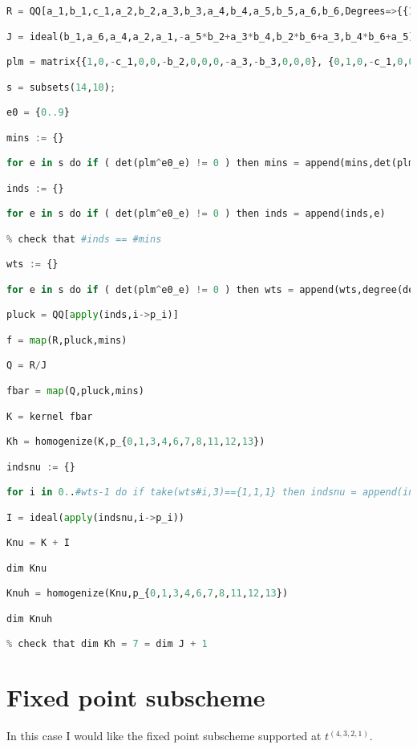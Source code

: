 \documentclass[11pt,draft]{article}
\begin{document}
\begin{lstlisting}[language=Python]
R = QQ[a_1,b_1,c_1,a_2,b_2,a_3,b_3,a_4,b_4,a_5,b_5,a_6,b_6,Degrees=>{{1,0,0,0},{1,0,0,1},{1,0,0,2},{1,1,0,0},{1,1,0,1},{1,1,1,0},{1,1,1,1},{0,1,0,0},{0,1,0,1},{0,1,1,0},{0,1,1,1},{0,0,1,0},{0,0,1,1}}]

J = ideal(b_1,a_6,a_4,a_2,a_1,-a_5*b_2+a_3*b_4,b_2*b_6+a_3,b_4*b_6+a_5)

plm = matrix{{1,0,-c_1,0,0,-b_2,0,0,0,-a_3,-b_3,0,0,0}, {0,1,0,-c_1,0,0,-b_2,0,0,0,-a_3,-b_3,0,0},{0,0,0,1,0,-b_4,0,0,0,-a_5,-b_5,0,0,0},{0,0,0,0,1,0,-b_4,0,0,0,-a_5,-b_5,0,0},{0,0,0,0,0,0,1,0,0,0,-b_6,0,0,0},{0,0,0,0,0,0,0,1,0,0,0,-b_6,0,0},{0,0,0,0,0,0,0,0,1,0,0,0,-b_6,0},{0,0,0,0,0,0,0,0,0,0,0,1,0,0},{0,0,0,0,0,0,0,0,0,0,0,0,1,0},{0,0,0,0,0,0,0,0,0,0,0,0,0,1}}

s = subsets(14,10);

e0 = {0..9}

mins := {}

for e in s do if ( det(plm^e0_e) != 0 ) then mins = append(mins,det(plm^e0_e))

inds := {}

for e in s do if ( det(plm^e0_e) != 0 ) then inds = append(inds,e)

% check that #inds == #mins

wts := {} 

for e in s do if ( det(plm^e0_e) != 0 ) then wts = append(wts,degree(det(plm^e0_e)))

pluck = QQ[apply(inds,i->p_i)]

f = map(R,pluck,mins)

Q = R/J

fbar = map(Q,pluck,mins)

K = kernel fbar

Kh = homogenize(K,p_{0,1,3,4,6,7,8,11,12,13})

indsnu := {}

for i in 0..#wts-1 do if take(wts#i,3)=={1,1,1} then indsnu = append(indsnu,inds#i)

I = ideal(apply(indsnu,i->p_i))

Knu = K + I

dim Knu

Knuh = homogenize(Knu,p_{0,1,3,4,6,7,8,11,12,13})

dim Knuh

% check that dim Kh = 7 = dim J + 1 
\end{lstlisting}
% 
\section*{Fixed point subscheme}
% 
In this case I would like the fixed point subscheme supported at $t^{(4,3,2,1)}$.
% 
\end{document}
